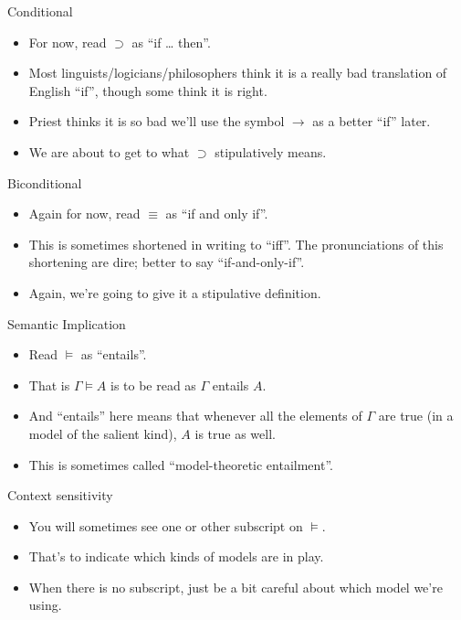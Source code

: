 \documentclass[
  17pt,
  letterpaper,
  ignorenonframetext,
  aspectratio=169,
]{beamer}
\providecommand{\tightlist}{%
  \setlength{\itemsep}{0pt}\setlength{\parskip}{0pt}}\usepackage{longtable,booktabs,array}
\begin{document}
\begin{frame}{Conditional}
\protect\hypertarget{conditional}{}
\begin{itemize}[<+->]
\tightlist
\item
  For now, read \(\supset\) as ``if \ldots{} then''.
\item
  Most linguists/logicians/philosophers think it is a really bad
  translation of English ``if'', though some think it is right.
\item
  Priest thinks it is so bad we'll use the symbol \(\rightarrow\) as a
  better ``if'' later.
\item
  We are about to get to what \(\supset\) stipulatively means.
\end{itemize}
\end{frame}

\begin{frame}{Biconditional}
\protect\hypertarget{biconditional}{}
\begin{itemize}[<+->]
\tightlist
\item
  Again for now, read \(\equiv\) as ``if and only if''.
\item
  This is sometimes shortened in writing to ``iff''. The pronunciations
  of this shortening are dire; better to say ``if-and-only-if''.
\item
  Again, we're going to give it a stipulative definition.
\end{itemize}
\end{frame}

\begin{frame}{Semantic Implication}
\protect\hypertarget{semantic-implication}{}
\begin{itemize}[<+->]
\tightlist
\item
  Read \(\vDash\) as ``entails''.
\item
  That is \(\Gamma \vDash A\) is to be read as \(\Gamma\) entails \(A\).
\item
  And ``entails'' here means that whenever all the elements of
  \(\Gamma\) are true (in a model of the salient kind), \(A\) is true as
  well.
\item
  This is sometimes called ``model-theoretic entailment''.
\end{itemize}
\end{frame}

\begin{frame}{Context sensitivity}
\protect\hypertarget{context-sensitivity}{}
\begin{itemize}[<+->]
\tightlist
\item
  You will sometimes see one or other subscript on \(\vDash\).
\item
  That's to indicate which kinds of models are in play.
\item
  When there is no subscript, just be a bit careful about which model
  we're using.
\end{itemize}
\end{frame}
\end{document}
